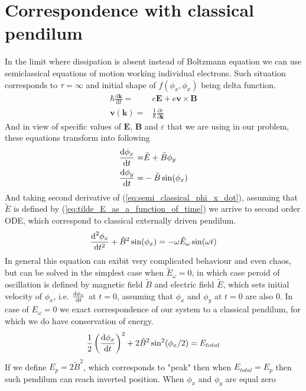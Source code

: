 \documentclass[40pt,letterpaper,physrev]{article}
\begin{document}
    \section{Correspondence with classical pendilum}
    In the limit where dissipation is absent instead of Boltzmann
    equation we can use semiclassical equations of motion working 
    individual electrons. Such situation corresponds to $\tau=\infty$ and initial shape of $f(\phi_x,\phi_x)$ being delta function. 
    \begin{align}
    	\hbar\frac{\text{d}\mathbf{k}}{\text{d}t}=&e\mathbf{E}+e\mathbf{v}\times\mathbf{B} \\
    	\mathbf{v}(\mathbf{k})=&\frac{1}{\hbar}\frac{\partial\varepsilon}{\partial\mathbf{k}}
    \end{align}
    And in view of specific values of $\mathbf{E}$, $\mathbf{B}$ and $\varepsilon$ that we are using in our problem, these equations transform into following
    \begin{align}
	    \frac{\text{d}\phi_x}{\text{d}t}=&\tilde{E}+\tilde{B}\phi_y \label{eq:semi_classical_phi_x_dot} \\
	    \frac{\text{d}\phi_y}{\text{d}t}=&-\tilde{B}\sin(\phi_x) \label{eq:semi_classical_phi_y_dot}
    \end{align}
    And taking second derivative of (\ref{eq:semi_classical_phi_x_dot}), assuming that $\tilde{E}$ is defined by (\ref{eq:tilde_E_as_a_function_of_time}) we arrive to second order ODE, which correspond to classical externally driven pendilum.
    \begin{equation}
    	\frac{\text{d}^{2}\phi_x}{\text{d}t^{2}}+\tilde{B}^2\sin(\phi_x)=-\omega\tilde{E}_\omega\sin(\omega t)
    \end{equation}
    In general this equation can exibit very complicated behaviour and even chaos, but can be solved in the simplest case when $\tilde{E}_\omega=0$, in which case peroid of oscillation is defined by magnetic field $\tilde{B}$ and electric field $\tilde{E}$, which sets initial velocity of $\phi_x$, i.e. $\frac{\text{d}\phi_x}{\text{d}t}$ at $t=0$, assuming that $\phi_x$ and $\phi_y$ at $t=0$ are also $0$. In case of $E_\omega=0$ we exact correspondence of our system to a classical pendilum, for which 
    we do have conservation of energy.
    \begin{equation}
    \frac{1}{2}\left ( \frac{\text{d}\phi_x}{\text{d}t} \right  )^2+2\tilde{B}^2\sin^2(\phi_x/2)=E_{total}
    \end{equation}
    If we define $E_p=2\tilde{B}^2$, which corresponds to 
    "peak" then when $E_{total}=E_p$ then such pendilum can reach 
    inverted position. When $\phi_x$ and $\phi_y$ are equal zero 
\end{document}

